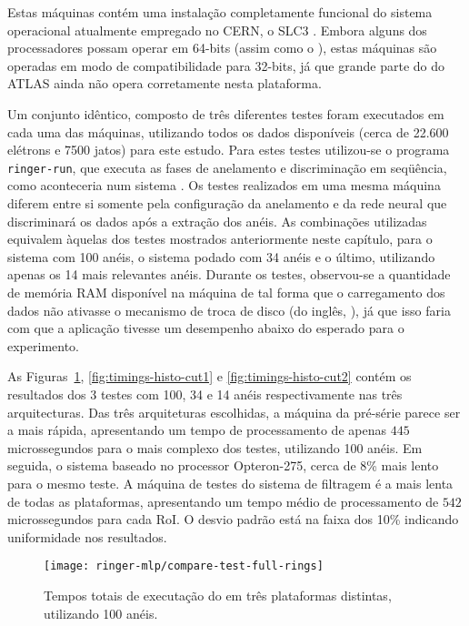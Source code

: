 Estas máquinas contém uma instalação completamente funcional do sistema
operacional atualmente empregado no CERN, o SLC3 \cite{cern-linx}. Embora
alguns dos processadores possam operar em 64-bits (assim como o
), estas máquinas são operadas em modo de compatibilidade
para 32-bits, já que grande parte do  do ATLAS ainda não opera
corretamente nesta plataforma.

Um conjunto idêntico, composto de três diferentes testes foram executados em
cada uma das máquinas, utilizando todos os dados disponíveis (cerca de 22.600
elétrons e 7500 jatos) para este estudo. Para estes testes utilizou-se o
programa \texttt{ringer-run}, que executa as fases de anelamento e
discriminação em seqüência, como aconteceria num sistema .  Os
testes realizados em uma mesma máquina diferem entre si somente pela
configuração da anelamento e da rede neural que discriminará os dados após a
extração dos anéis. As combinações utilizadas equivalem àquelas dos testes
mostrados anteriormente neste capítulo, para o sistema com 100 anéis, o
sistema podado com 34 anéis e o último, utilizando apenas os 14 mais
relevantes anéis. Durante os testes, observou-se a quantidade de memória RAM
disponível na máquina de tal forma que o carregamento dos dados não ativasse o
mecanismo de troca de disco (do inglês, ), já que isso faria com que
a aplicação tivesse um desempenho abaixo do esperado para o experimento.

As Figuras~\ref{fig:timings-histo-full}, \ref{fig:timings-histo-cut1} e
\ref{fig:timings-histo-cut2} contém os resultados dos 3 testes com 100, 34 e
14 anéis respectivamente nas três arquitecturas. Das três arquiteturas
escolhidas, a máquina da pré-série parece ser a mais rápida, apresentando um
tempo de processamento de apenas $445$ microssegundos para o mais complexo dos
testes, utilizando 100 anéis. Em seguida, o sistema baseado no processor
Opteron-275, cerca de 8\% mais lento para o mesmo teste. A máquina de testes
do sistema de filtragem é a mais lenta de todas as plataformas, apresentando
um tempo médio de processamento de $542$ microssegundos para cada RoI. O
desvio padrão está na faixa dos 10\% indicando uniformidade nos resultados.

\begin{figure}
\begin{center}
\texttt{[image: ringer-mlp/compare-test-full-rings]}
\end{center}
\caption{Tempos totais de executação do  em três plataformas
distintas, utilizando 100 anéis.}
\label{fig:timings-histo-full}
\end{figure}

